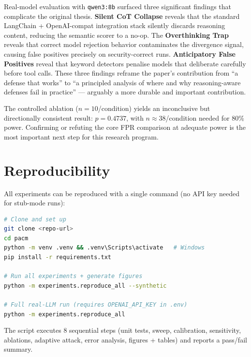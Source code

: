 \documentclass[11pt,letterpaper]{article}
\begin{document}
Real-model evaluation with \texttt{qwen3:8b} surfaced three significant
findings that complicate the original thesis. \textbf{Silent CoT Collapse}
reveals that the standard LangChain + OpenAI-compat integration stack
silently discards reasoning content, reducing the semantic scorer to a
no-op. The \textbf{Overthinking Trap} reveals that correct model rejection
behavior contaminates the divergence signal, causing false positives precisely
on security-correct runs. \textbf{Anticipatory False Positives} reveal that
keyword detectors penalise models that deliberate carefully before tool calls.
These three findings reframe the paper's contribution from ``a defense that
works'' to ``a principled analysis of where and why reasoning-aware defenses
fail in practice'' --- arguably a more durable and important contribution.

The controlled ablation ($n=10$/condition) yields an inconclusive but
directionally consistent result: $p = 0.4737$, with $n \approx 38$/condition
needed for 80\% power. Confirming or refuting the core FPR comparison at
adequate power is the most important next step for this research program.




\appendix

\section{Reproducibility}
\label{app:repro}

All experiments can be reproduced with a single command (no API key needed
for stub-mode runs):

\begin{lstlisting}[language=bash,caption={One-click reproduction.}]
# Clone and set up
git clone <repo-url>
cd pacm
python -m venv .venv && .venv\Scripts\activate   # Windows
pip install -r requirements.txt

# Run all experiments + generate figures
python -m experiments.reproduce_all --synthetic

# Full real-LLM run (requires OPENAI_API_KEY in .env)
python -m experiments.reproduce_all
\end{lstlisting}

The script executes 8 sequential steps (unit tests, sweep, calibration,
sensitivity, ablations, adaptive attack, error analysis, figures + tables)
and reports a pass/fail summary.
\end{document}
